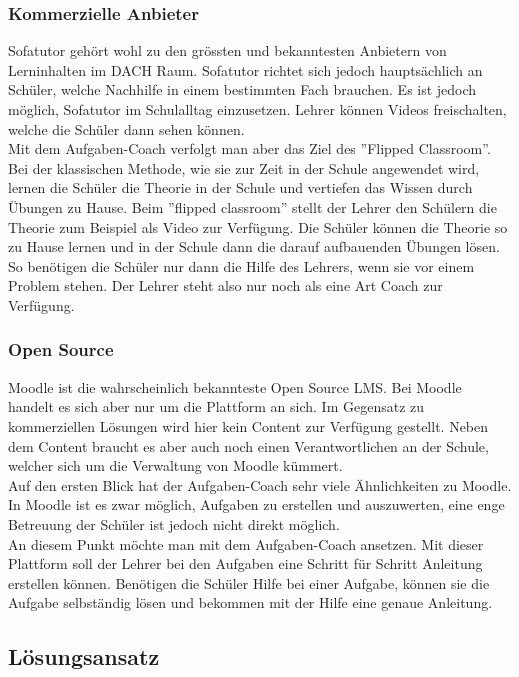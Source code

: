 \subsubsection{Kommerzielle Anbieter}
Sofatutor gehört wohl zu den grössten und bekanntesten Anbietern von Lerninhalten im DACH Raum. Sofatutor richtet sich jedoch hauptsächlich an Schüler, welche Nachhilfe in einem bestimmten Fach brauchen. Es ist jedoch möglich, Sofatutor im Schulalltag einzusetzen. Lehrer können Videos freischalten, welche die Schüler dann sehen können. \\

\noindent Mit dem Aufgaben-Coach verfolgt man aber das Ziel des ''Flipped Classroom''. Bei der klassischen Methode, wie sie zur Zeit in der Schule angewendet wird, lernen die Schüler die Theorie in der Schule und vertiefen das Wissen durch Übungen zu Hause. Beim ''flipped classroom'' stellt der Lehrer den Schülern die Theorie zum Beispiel als Video zur Verfügung. Die Schüler können die Theorie so zu Hause lernen und in der Schule dann die darauf aufbauenden Übungen lösen. So benötigen die Schüler nur dann die Hilfe des Lehrers, wenn sie vor einem Problem stehen. Der Lehrer steht also nur noch als eine Art Coach zur Verfügung. 

\subsubsection{Open Source}
Moodle ist die wahrscheinlich bekannteste Open Source LMS. Bei Moodle handelt es sich aber nur um die Plattform an sich. Im Gegensatz zu kommerziellen Lösungen wird hier kein Content zur Verfügung gestellt. Neben dem Content braucht es aber auch noch einen Verantwortlichen an der Schule, welcher sich um die Verwaltung von Moodle kümmert. \\

\noindent Auf den ersten Blick hat der Aufgaben-Coach sehr viele Ähnlichkeiten zu Moodle. In Moodle ist es zwar möglich, Aufgaben zu erstellen und auszuwerten, eine enge Betreuung der Schüler ist jedoch nicht direkt möglich. \\

\noindent An diesem Punkt möchte man mit dem Aufgaben-Coach ansetzen. Mit dieser Plattform soll der Lehrer bei den Aufgaben eine Schritt für Schritt Anleitung erstellen können. Benötigen die Schüler Hilfe bei einer Aufgabe, können sie die Aufgabe selbständig lösen und bekommen mit der Hilfe eine genaue Anleitung.


\subsection{Lösungsansatz}

